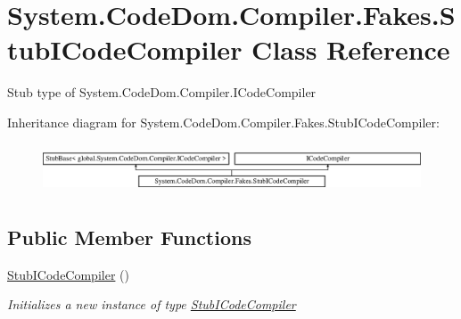 \hypertarget{class_system_1_1_code_dom_1_1_compiler_1_1_fakes_1_1_stub_i_code_compiler}{\section{System.\-Code\-Dom.\-Compiler.\-Fakes.\-Stub\-I\-Code\-Compiler Class Reference}
\label{class_system_1_1_code_dom_1_1_compiler_1_1_fakes_1_1_stub_i_code_compiler}
}


Stub type of System.\-Code\-Dom.\-Compiler.\-I\-Code\-Compiler 


Inheritance diagram for System.\-Code\-Dom.\-Compiler.\-Fakes.\-Stub\-I\-Code\-Compiler\-:\begin{figure}[H]
\begin{center}
\leavevmode
\includegraphics[height=1.493333cm]{class_system_1_1_code_dom_1_1_compiler_1_1_fakes_1_1_stub_i_code_compiler}
\end{center}
\end{figure}
\subsection*{Public Member Functions}
\begin{DoxyCompactItemize}
\item 
\hyperlink{class_system_1_1_code_dom_1_1_compiler_1_1_fakes_1_1_stub_i_code_compiler_a1241a54bfda7f81b44236a7a7e2c038d}{Stub\-I\-Code\-Compiler} ()
\begin{DoxyCompactList}\small\item\em Initializes a new instance of type \hyperlink{class_system_1_1_code_dom_1_1_compiler_1_1_fakes_1_1_stub_i_code_compiler}{Stub\-I\-Code\-Compiler}\end{DoxyCompactList}\end{DoxyCompactItemize}
